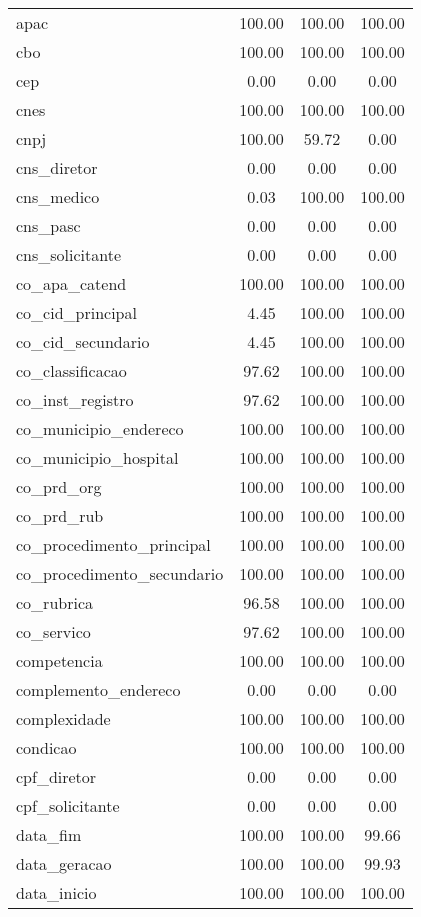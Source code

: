 \documentclass[
  12,
  table]{proadi}
\begin{document}
\begin{longtable}{lccc}
\endfoot
\bottomrule
\endlastfoot
apac & 100.00 & 100.00 & 100.00\\
cbo & 100.00 & 100.00 & 100.00\\
cep & 0.00 & 0.00 & 0.00\\
cnes & 100.00 & 100.00 & 100.00\\
cnpj & 100.00 & 59.72 & 0.00\\
\addlinespace
cns\_diretor & 0.00 & 0.00 & 0.00\\
cns\_medico & 0.03 & 100.00 & 100.00\\
cns\_pasc & 0.00 & 0.00 & 0.00\\
cns\_solicitante & 0.00 & 0.00 & 0.00\\
co\_apa\_catend & 100.00 & 100.00 & 100.00\\
\addlinespace
co\_cid\_principal & 4.45 & 100.00 & 100.00\\
co\_cid\_secundario & 4.45 & 100.00 & 100.00\\
co\_classificacao & 97.62 & 100.00 & 100.00\\
co\_inst\_registro & 97.62 & 100.00 & 100.00\\
co\_municipio\_endereco & 100.00 & 100.00 & 100.00\\
\addlinespace
co\_municipio\_hospital & 100.00 & 100.00 & 100.00\\
co\_prd\_org & 100.00 & 100.00 & 100.00\\
co\_prd\_rub & 100.00 & 100.00 & 100.00\\
co\_procedimento\_principal & 100.00 & 100.00 & 100.00\\
co\_procedimento\_secundario & 100.00 & 100.00 & 100.00\\
\addlinespace
co\_rubrica & 96.58 & 100.00 & 100.00\\
co\_servico & 97.62 & 100.00 & 100.00\\
competencia & 100.00 & 100.00 & 100.00\\
complemento\_endereco & 0.00 & 0.00 & 0.00\\
complexidade & 100.00 & 100.00 & 100.00\\
\addlinespace
condicao & 100.00 & 100.00 & 100.00\\
cpf\_diretor & 0.00 & 0.00 & 0.00\\
cpf\_solicitante & 0.00 & 0.00 & 0.00\\
data\_fim & 100.00 & 100.00 & 99.66\\
data\_geracao & 100.00 & 100.00 & 99.93\\
\addlinespace
data\_inicio & 100.00 & 100.00 & 100.00\\

\end{longtable}
\end{document}

